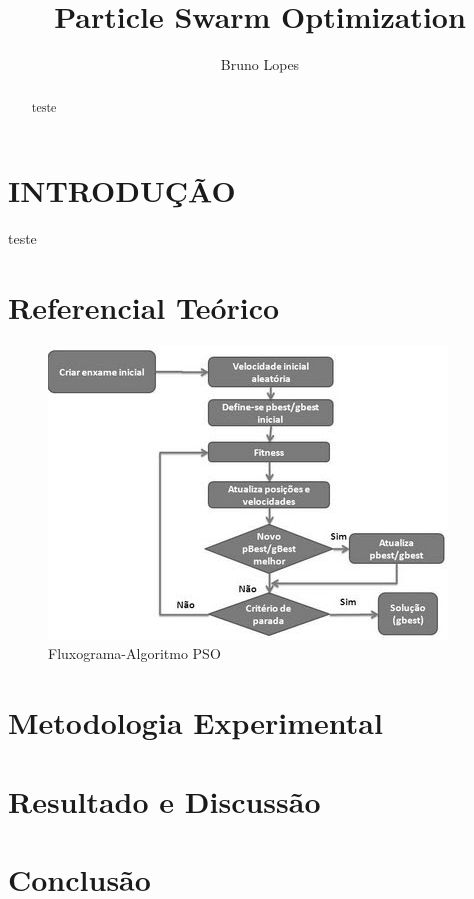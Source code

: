 \documentclass[conference]{IEEEtran}
\begin{document}
\title{Particle Swarm Optimization}

\author{Bruno Lopes}
\maketitle

\begin{abstract}
teste

\end{abstract}

\section{INTRODUÇÃO}
teste

\section{Referencial Teórico}
	
	
	\begin{figure}[htbp]
	\centerline{\includegraphics[scale=0.4]{pso_algoritmo.JPG}}
	\caption{Fluxograma-Algoritmo PSO}
	\label{fig}
	\end{figure}
	
	
\section{Metodologia Experimental}
    
  
\section{Resultado e Discussão}

   
    
\section*{Conclusão}

  

\begin{thebibliography}{00}


\end{thebibliography}
\end{document}
